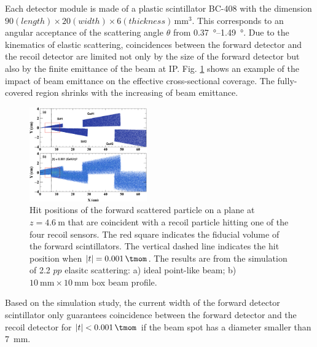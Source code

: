 \documentclass[number,5p]{elsarticle}
\begin{document}
Each detector module is made of a plastic scintillator BC-408 \cite{bc408} with the dimension $90 (length) \times 20 (width) \times 6
(thickness)\,\si{\mm\tothe{3}}$.
This corresponds to an angular acceptance of the scattering angle $\theta$ from \SIrange{0.37}{1.49}{\degree}.
Due to the kinematics of elastic scattering, coincidences between the forward
detector and the recoil detector are limited not only by the size of the forward
detector but also by the finite emittance of the beam at IP.
Fig. \ref{fig:forward_acceptance} shows an example of the impact of beam emittance on the
effective cross-sectional coverage.
The fully-covered region shrinks with the increasing of beam emittance. 
\begin{figure}[htb]
  \centering
  \includegraphics[width=0.45\textwidth]{./fwd_acceptance.png}
  \caption{
    Hit positions of the forward scattered particle on a plane at
    $z=\SI{4.6}{\m}$ that are coincident with a recoil particle hitting one of
    the four recoil sensors.
    The red square indicates the fiducial volume of the forward scintillators.
    The vertical dashed line indicates the hit position when $|t| = \SI{0.001}{\tmom}$.
    The results are from the simulation of \SI{2.2}{\momentum}
    $pp$ elasitc scattering: a) ideal point-like beam; b) $\SI{10}{\mm}\times\SI{10}{\mm}$ box beam profile.
    }
  \label{fig:forward_acceptance}
\end{figure}
Based on the simulation study, the current width of the forward detector
scintillator only guarantees coincidence between the forward detector and the
recoil detector for $|t| < \SI{0.001}{\tmom}$ if the beam spot has a diameter smaller than \SI{7}{\mm}.
\end{document}
